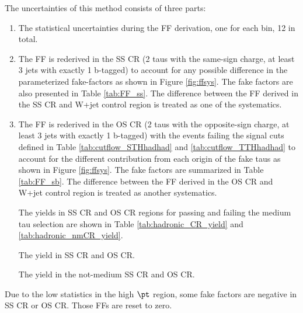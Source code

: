 The uncertainties of this method consists of three parts:
\begin{enumerate}

\item The statistical uncertainties during the FF derivation, one for each bin, 12 in total.

\item The FF is rederived in the SS CR (2 taus with the same-sign charge, at least 3 jets with exactly 1 b-tagged) to account for any possible difference in 
  the parameterized fake-factors as shown in Figure \ref{fig:ffsys}. The fake factors are also presented in Table \ref{tab:FF_ss}. The difference between the FF
  derived in the SS CR and W+jet control region is treated as one of the systematics.

\item The FF is rederived in the OS CR (2 taus with the opposite-sign charge, at least 3 jets with exactly 1 b-tagged) with the events failing the signal cuts
  defined in Table \ref{tab:cutflow_STHhadhad} and \ref{tab:cutflow_TTHhadhad} to account for the different contribution from each origin of the fake taus as shown in Figure \ref{fig:ffsys}. The fake factors are summarized in Table \ref{tab:FF_sb}. The difference between the FF derived in the OS CR and W+jet control region is treated as another
  systematics.

The yields in SS CR and OS CR regions for passing and failing the medium tau selection are shown in Table \ref{tab:hadronic_CR_yield} and \ref{tab:hadronic_nmCR_yield}.

\begin{table}
\caption{The yield in SS CR and OS CR.}
\label{tab:hadronic_CR_yield}


\end{table}

\begin{table}
\caption{The yield in the not-medium SS CR and OS CR.}
\label{tab:hadronic_nmCR_yield}


\end{table}

\end{enumerate}



Due to the low statistics in the high $\pt$ region, some fake factors are negative in SS CR or OS CR. Those FFs are reset to zero.

